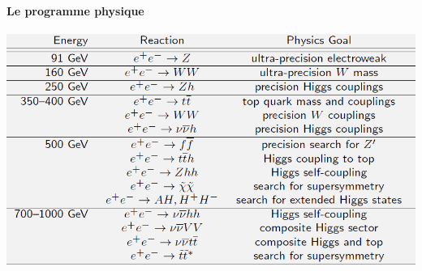 \documentclass[8pt]{beamer}
\begin{document}
  \begin{frame}
  \frametitle{\secname}
  \framesubtitle{Le programme physique}
    \begin{center}
      \includegraphics[width=\linewidth]{ilc_program.png}
    \end{center}
  \end{frame}
  
\end{document}
